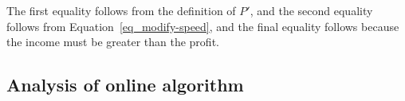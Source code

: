 \documentclass[10 pt,final]{article}
\begin{document}
The first equality follows from the definition of $P'$, and the second equality follows from Equation~\ref{eq_modify-speed}, and the final equality follows because the income must be greater than the profit.

\subsection{Analysis of online algorithm}











\end{document}
